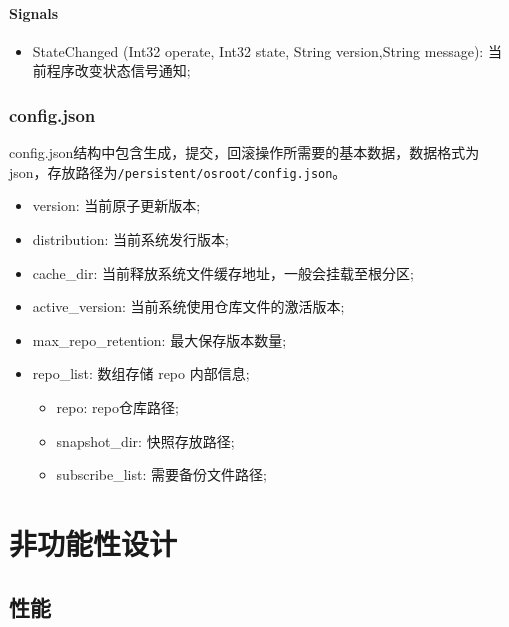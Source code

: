 \documentclass{utart}
\begin{document}
\paragraph{Signals}
\begin{itemize}[leftmargin=4em]
  \item StateChanged (Int32 operate, Int32 state, String version,String message): 当前程序改变状态信号通知;
\end{itemize}

\subsubsection{config.json}
config.json结构中包含生成，提交，回滚操作所需要的基本数据，数据格式为json，存放路径为\texttt{/persistent/osroot/config.json}。

\begin{itemize}[leftmargin=4em]
  \item version: 当前原子更新版本;
  \item distribution: 当前系统发行版本;
  \item cache\_dir: 当前释放系统文件缓存地址，一般会挂载至根分区;
  \item active\_version: 当前系统使用仓库文件的激活版本;
  \item max\_repo\_retention: 最大保存版本数量;
  \item repo\_list: 数组存储 repo 内部信息;
    \begin{itemize}[leftmargin=4em]
    \item repo: repo仓库路径;
    \item snapshot\_dir: 快照存放路径;
    \item subscribe\_list: 需要备份文件路径;
    \end{itemize}
\end{itemize}

\section{非功能性设计}
\subsection{性能}
\end{document}
